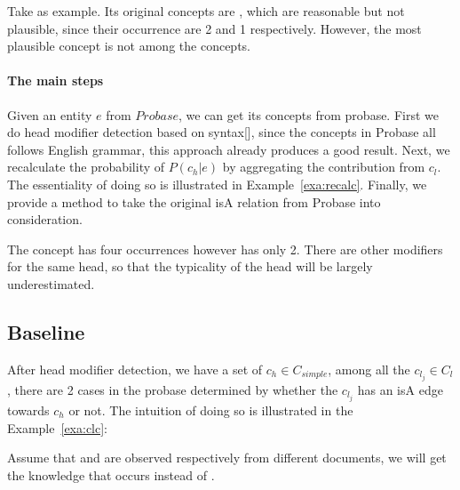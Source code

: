 \begin{example}
\label{exa:HvsO}
Take  as example. Its original concepts are , which are reasonable but not plausible, since their occurrence are 2 and 1 respectively. However, the most plausible concept  is not among the concepts.
\end{example}

\paragraph{The main steps}
Given an entity $e$ from $Probase$, we can get its concepts from probase. First we do head modifier detection based on syntax[], since the concepts in Probase all follows English grammar, this approach already produces a good result. Next, we recalculate the probability of $P({c_h}|e)$ by aggregating the contribution from $c_l$. The essentiality of doing so is illustrated in Example~\ref{exa:recalc}. Finally, we provide a method to take the original isA relation from Probase into consideration.




\begin{example}
\label{exa:recalc}
 The concept has four occurrences however  has only 2. There are other modifiers for the same head, so that the typicality of the head will be largely underestimated.
\end{example}



\subsection{Baseline}
After head modifier detection, we have a set of ${c_h} \in C_{simple}$, among all the $c_{l_j}\in C_{l}$, there are 2 cases in the probase determined by whether the $c_{l_j}$ has an isA edge towards ${c_h}$ or not.
The intuition of doing so is illustrated in the Example~\ref{exa:clc}:

\begin{example}
\label{exa:clc}
Assume that   and  are observed respectively  from different documents, we will get the knowledge that  occurs  instead of .
\end{example}


